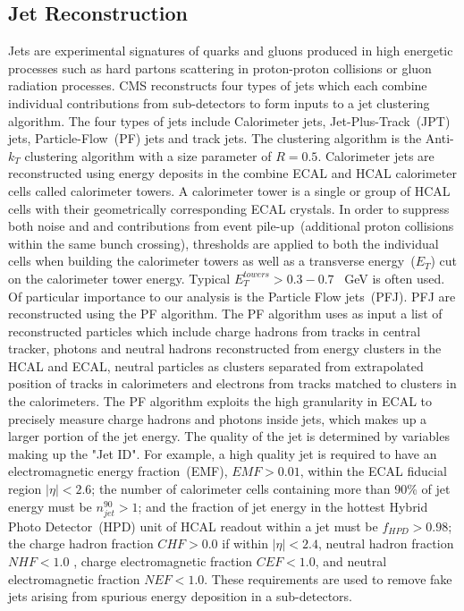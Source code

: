 \subsection{Jet Reconstruction}
Jets are experimental signatures of quarks and gluons produced in high energetic processes such as hard partons scattering in proton-proton collisions or gluon radiation processes.
CMS reconstructs four types of jets which each combine individual contributions from sub-detectors  to form inputs to a jet clustering algorithm. The four types of jets include Calorimeter jets, Jet-Plus-Track~(JPT) jets, Particle-Flow~(PF) jets and track jets. The clustering algorithm is the Anti-$k_{T}$ clustering algorithm with a size parameter of $R = 0.5$.
Calorimeter jets are reconstructed using energy deposits in the combine ECAL and HCAL calorimeter cells called calorimeter towers. A calorimeter tower is a single or group of HCAL cells with their geometrically corresponding ECAL crystals. In order to suppress both noise and and contributions from event pile-up~(additional proton collisions within the same bunch crossing), thresholds are applied to both the individual cells when building the calorimeter towers as well as a transverse energy~($E_{T}$) cut on the calorimeter tower energy. Typical $E^{towers}_{T} > 0.3 - 0.7$~ GeV is often used.
Of particular importance to our analysis is the Particle Flow jets~(PFJ).  PFJ are reconstructed using the PF algorithm. The PF algorithm uses as input a list of reconstructed particles which include charge hadrons from tracks  in central tracker, photons and neutral  hadrons reconstructed from energy clusters in the HCAL and ECAL, neutral particles as clusters separated from extrapolated position of tracks in calorimeters  and electrons from tracks matched to clusters in the calorimeters.
The PF algorithm exploits the high granularity in ECAL to precisely measure charge hadrons and photons inside jets, which makes up a larger portion of the jet energy.
The quality of the jet is determined by variables making up the "Jet ID". For example,  a high quality jet is required to have an electromagnetic energy fraction~(EMF), $EMF > 0.01$,  within the ECAL fiducial region $|\eta| < 2.6$; the number of calorimeter cells containing more than 90\% of jet energy  must be $n^{90}_{jet} > 1$; and the fraction of jet energy in the hottest  Hybrid Photo Detector~(HPD) unit  of HCAL readout within a jet must be $f_{HPD} > 0.98$; the charge  hadron fraction $CHF >0.0$ if within $|\eta| < 2.4$, neutral hadron fraction $NHF < 1.0$ , charge electromagnetic fraction $CEF < 1.0$, and neutral electromagnetic fraction $NEF < 1.0 $. These requirements are used to remove fake jets arising from spurious energy deposition in a sub-detectors.
